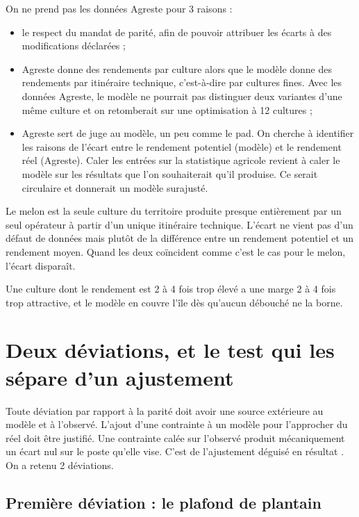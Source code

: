 On ne prend pas les données Agreste pour \num{3} raisons :
\begin{itemize}[leftmargin=1.2em,itemsep=3pt]
  \item le respect du mandat de parité, afin de pouvoir attribuer les écarts à des modifications
    déclarées ;
  \item Agreste donne des rendements par culture alors que le modèle donne des rendements par
    itinéraire technique, c'est-à-dire par cultures fines. Avec les données Agreste, le modèle ne
    pourrait pas distinguer deux variantes d'une même culture et on retomberait sur une
    optimisation à \num{12} cultures ;
  \item Agreste sert de juge au modèle, un peu comme le \gls{pad}. On cherche à identifier les
    raisons de l'écart entre le rendement potentiel (modèle) et le rendement réel (Agreste).
    Caler les entrées sur la statistique agricole revient à caler le modèle sur les résultats que
    l'on souhaiterait qu'il produise. Ce serait circulaire et donnerait un modèle surajusté.
\end{itemize}

Le melon est la seule culture du territoire produite presque entièrement par un seul opérateur à
partir d'un unique itinéraire technique. L'écart ne vient pas d'un défaut de données mais plutôt
de la différence entre un rendement potentiel et un rendement moyen. Quand les deux coïncident
comme c'est le cas pour le melon, l'écart disparaît.

Une culture dont le rendement est \num{2} à \num{4} fois trop élevé a une marge \num{2} à
\num{4} fois trop attractive, et le modèle en couvre l'île dès qu'aucun débouché ne la borne.


\section{Deux déviations, et le test qui les sépare d'un ajustement}
\label{sec:deviations}

Toute déviation par rapport à la parité doit avoir une source extérieure au modèle et à
l'observé. L'ajout d'une contrainte à un modèle pour l'approcher du réel doit être justifié. Une
contrainte calée sur l'observé produit mécaniquement un écart nul sur le poste qu'elle vise.
C'est de l'ajustement déguisé en résultat \parencite{howitt1995}. On a retenu \num{2}
déviations.

\subsection*{Première déviation : le plafond de plantain}

